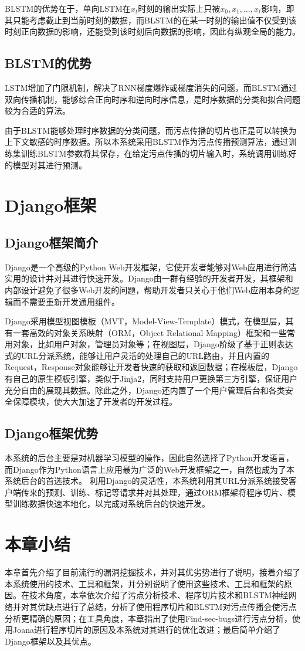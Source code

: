 BLSTM的优势在于，单向LSTM在$x_t$时刻的输出实际上只被$x_0, x_1, \dots, x_t$影响，即其只能考虑截止到当前时刻的数据，而BLSTM的在某一时刻的输出值不仅受到该时刻正向数据的影响，还能受到该时刻后向数据的影响，因此有纵观全局的能力。\\

\subsection{BLSTM的优势}
LSTM增加了门限机制，解决了RNN梯度爆炸或梯度消失的问题，而BLSTM通过双向传播机制，能够综合正向时序和逆向时序信息，是时序数据的分类和拟合问题较为合适的算法。

由于BLSTM能够处理时序数据的分类问题，而污点传播的切片也正是可以转换为上下文敏感的时序数据。所以本系统采用BLSTM作为污点传播预测算法，通过训练集训练BLSTM参数将其保存，在给定污点传播的切片输入时，系统调用训练好的模型对其进行预测。

\section{Django框架}
\subsection{Django框架简介}
Django是一个高级的Python Web开发框架，它使开发者能够对Web应用进行简洁实用的设计并对其进行快速开发。Django由一群有经验的开发者开发，其框架和内部设计避免了很多Web开发的问题，帮助开发者只关心于他们Web应用本身的逻辑而不需要重新开发通用组件。

Django采用模型视图模板（MVT，Model-View-Template）模式，在模型层，其有一套高效的对象关系映射（ORM，Object Relational Mapping）框架和一些常用对象，比如用户对象，管理员对象等；在视图层，Django阶级了基于正则表达式的URL分派系统，能够让用户灵活的处理自己的URL路由，并且内置的Request，Response对象能够让开发者快速的获取和返回数据；在模板层，Django有自己的原生模板引擎，类似于Jinja2，同时支持用户更换第三方引擎，保证用户充分自由的展现其数据。除此之外，Django还内置了一个用户管理后台和各类安全保障模块，使大大加速了开发者的开发过程。\\

\subsection{Django框架优势}
本系统的后台主要是对机器学习模型的操作，因此自然选择了Python开发语言，而Django作为Python语言上应用最为广泛的Web开发框架之一，自然也成为了本系统后台的首选技术。
利用Django的灵活性，本系统利用其URL分派系统接受客户端传来的预测、训练、标记等请求并对其处理，通过ORM框架将程序切片、模型训练数据快速本地化，以完成对系统后台的快速开发。

\section{本章小结}
本章首先介绍了目前流行的漏洞挖掘技术，并对其优劣势进行了说明，接着介绍了本系统使用的技术、工具和框架，并分别说明了使用这些技术、工具和框架的原因。在技术角度，本章依次介绍了污点分析技术、程序切片技术和BLSTM神经网络并对其优缺点进行了总结，分析了使用程序切片和BLSTM对污点传播会使污点分析更精确的原因；在工具角度，本章指出了使用Find-sec-bugs进行污点分析，使用Joana进行程序切片的原因及本系统对其进行的优化改进；最后简单介绍了Django框架以及其优点。